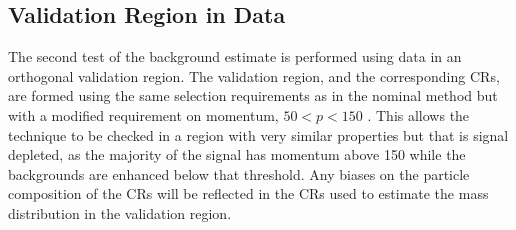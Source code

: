 \subsection{Validation Region in Data}
The second test of the background estimate is performed using data in an orthogonal validation region.
The validation region, and the corresponding \acp{CR}, are formed using the same selection requirements as in the nominal method but with a modified requirement on momentum, $50 < p < 150$ \GeV.
This allows the technique to be checked in a region with very similar properties but that is signal depleted, as the majority of the signal has momentum above 150 \GeV while the backgrounds are enhanced below that threshold.
Any biases on the particle composition of the \acp{CR} will be reflected in the \acp{CR} used to estimate the mass distribution in the validation region.


